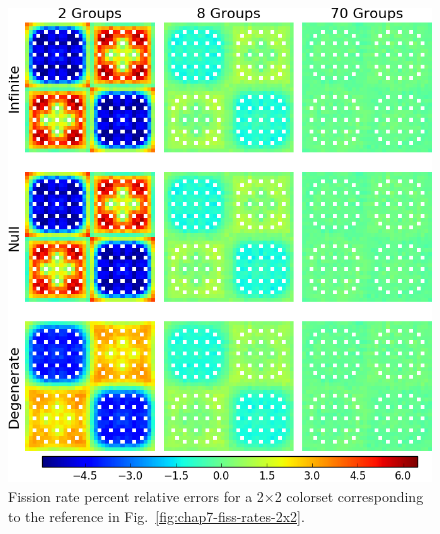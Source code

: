 \begin{figure}[h!]
\centering
\includegraphics[width=\linewidth]{figures/quantification/2x2/fiss-err}
\caption[Fission rate errors for a 2$\times$2 colorset]{Fission rate percent relative errors for a 2$\times$2 colorset corresponding to the reference in Fig.~\ref{fig:chap7-fiss-rates-2x2}.}
\label{fig:chap8-2x2-fiss-err}
\end{figure}

\clearpage


